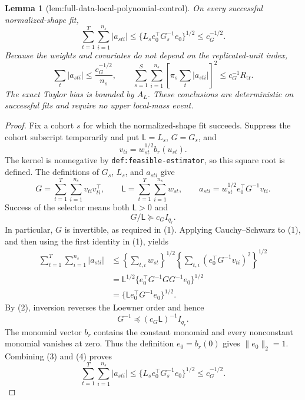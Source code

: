 \documentclass{article}
\newtheorem{lemma}{Lemma}
\begin{document}
\begin{lemma}[lem:full-data-local-polynomial-control]\label{lem:full-data-local-polynomial-control}
On every successful normalized-shape fit,
\[
\sum_{t=1}^{T}\sum_{i=1}^{n_s}|a_{sti}|
\le\{L_se_0^\top G_s^{-1}e_0\}^{1/2}
\le c_G^{-1/2}.
\]
Because the weights and covariates do not depend on the replicated-unit index,
\[
\sum_t|a_{sti}|\le\frac{c_G^{-1/2}}{n_s},
\qquad
\sum_{s=1}^{S}\sum_{i=1}^{n_s}
\left[\pi_s\sum_t|a_{sti}|\right]^2
\le c_G^{-1}R_{\mathrm{tr}}.
\]
The exact Taylor bias is bounded by \(A_L\).  These conclusions are deterministic on successful fits and require no upper local-mass event.
\end{lemma}
\begin{proof}
Fix a cohort \(s\) for which the normalized-shape fit succeeds.  Suppress the cohort subscript temporarily and put \(\mathsf L=L_s\), \(G=G_s\), and
\[
v_{ti}=w_{st}^{1/2}b_r(u_{st}).
\]
The kernel is nonnegative by \texttt{def:feasible-estimator}, so this square root is defined.  The definitions of \(G_s\), \(L_s\), and \(a_{sti}\) give
\[
G=\sum_{t=1}^{T}\sum_{i=1}^{n_s}v_{ti}v_{ti}^{\top},
\qquad
\mathsf L=\sum_{t=1}^{T}\sum_{i=1}^{n_s}w_{st},
\qquad
a_{sti}=w_{st}^{1/2}e_0^{\top}G^{-1}v_{ti}.
\tag{1}
\]
Success of the selector means both \(\mathsf L>0\) and
\[
G/\mathsf L\succeq c_G I_{q_r}.
\tag{2}
\]
In particular, \(G\) is invertible, as required in (1).  Applying Cauchy--Schwarz to (1), and then using the first identity in (1), yields
\[
\begin{aligned}
\sum_{t=1}^{T}\sum_{i=1}^{n_s}|a_{sti}|
&\le
\left\{\sum_{t,i}w_{st}\right\}^{1/2}
\left\{\sum_{t,i}
       (e_0^{\top}G^{-1}v_{ti})^2\right\}^{1/2}\\
&=\mathsf L^{1/2}
\{e_0^{\top}G^{-1}GG^{-1}e_0\}^{1/2}\\
&=\{\mathsf L e_0^{\top}G^{-1}e_0\}^{1/2}.
\end{aligned}
\tag{3}
\]
By (2), inversion reverses the Loewner order and hence
\[
G^{-1}\preceq(c_G\mathsf L)^{-1}I_{q_r}.
\tag{4}
\]
The monomial vector \(b_r\) contains the constant monomial and every nonconstant monomial vanishes at zero.  Thus the definition \(e_0=b_r(0)\) gives \(\|e_0\|_2=1\).  Combining (3) and (4) proves
\[
\sum_{t=1}^{T}\sum_{i=1}^{n_s}|a_{sti}|
\le \{L_s e_0^{\top}G_s^{-1}e_0\}^{1/2}
\le c_G^{-1/2}.
\tag{5}
\]


\end{proof}
\end{document}
